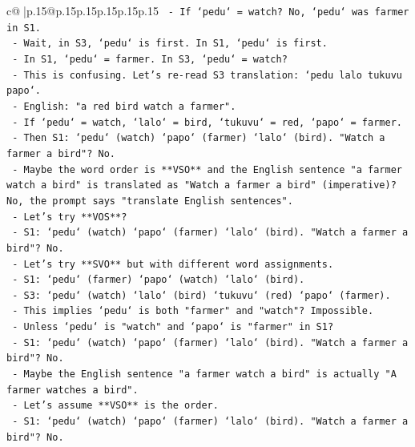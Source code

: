 \documentclass{article}
\begin{document}
{\begin{supertabular}{c@{$\;$}|p{.15\linewidth}@{}p{.15\linewidth}p{.15\linewidth}p{.15\linewidth}p{.15\linewidth}p{.15\linewidth}}
{{{\texttt{                 {-} If `pedu` = watch? No, `pedu` was farmer in S1.} \\
\texttt{                 {-} Wait, in S3, `pedu` is first. In S1, `pedu` is first.} \\
\texttt{                 {-} In S1, `pedu` = farmer. In S3, `pedu` = watch?} \\
\texttt{                 {-} This is confusing. Let's re{-}read S3 translation: `pedu lalo tukuvu papo`.} \\
\texttt{                 {-} English: "a red bird watch a farmer".} \\
\texttt{                 {-} If `pedu` = watch, `lalo` = bird, `tukuvu` = red, `papo` = farmer.} \\
\texttt{                 {-} Then S1: `pedu` (watch) `papo` (farmer) `lalo` (bird). "Watch a farmer a bird"? No.} \\
\texttt{                 {-} Maybe the word order is **VSO** and the English sentence "a farmer watch a bird" is translated as "Watch a farmer a bird" (imperative)? No, the prompt says "translate English sentences".} \\
\texttt{                 {-} Let's try **VOS**?} \\
\texttt{                   {-} S1: `pedu` (watch) `papo` (farmer) `lalo` (bird). "Watch a farmer a bird"? No.} \\
\texttt{                 {-} Let's try **SVO** but with different word assignments.} \\
\texttt{                   {-} S1: `pedu` (farmer) `papo` (watch) `lalo` (bird).} \\
\texttt{                   {-} S3: `pedu` (watch) `lalo` (bird) `tukuvu` (red) `papo` (farmer).} \\
\texttt{                   {-} This implies `pedu` is both "farmer" and "watch"? Impossible.} \\
\texttt{                   {-} Unless `pedu` is "watch" and `papo` is "farmer" in S1?} \\
\texttt{                     {-} S1: `pedu` (watch) `papo` (farmer) `lalo` (bird). "Watch a farmer a bird"? No.} \\
\texttt{                   {-} Maybe the English sentence "a farmer watch a bird" is actually "A farmer watches a bird".} \\
\texttt{                   {-} Let's assume **VSO** is the order.} \\
\texttt{                     {-} S1: `pedu` (watch) `papo` (farmer) `lalo` (bird). "Watch a farmer a bird"? No.} \\
}}}
\end{supertabular}}
\end{document}
